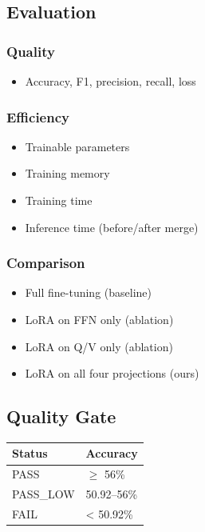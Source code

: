 \subsection{Evaluation}

\subsubsection{Quality}
\begin{itemize}
\item Accuracy, F1, precision, recall, loss

\end{itemize}
\subsubsection{Efficiency}
\begin{itemize}
\item Trainable parameters
\item Training memory
\item Training time
\item Inference time (before/after merge)

\end{itemize}
\subsubsection{Comparison}
\begin{itemize}
\item Full fine-tuning (baseline)
\item LoRA on FFN only (ablation)
\item LoRA on Q/V only (ablation)
\item LoRA on all four projections (ours)

\end{itemize}
\subsection{Quality Gate}

\begin{table}[H]
\centering
\small
\begin{tabular}{ll}
\toprule
\textbf{Status} & \textbf{Accuracy} \\
\midrule
PASS & $\ge$ 56\% \\
PASS\_LOW & 50.92--56\% \\
FAIL & < 50.92\% \\
\bottomrule
\end{tabular}
\end{table}

